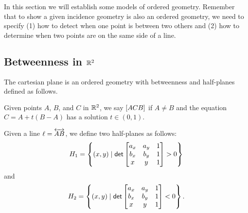 In this section we will establish some models of ordered geometry.
Remember that to show a given incidence geometry is also an ordered geometry, we need to specify (1) how to detect when one point is between two others and (2) how to determine when two points are on the same side of a line.

\subsection{Betweenness in \(\mathbb{R}^2\)}

\begin{prop}
The cartesian plane is an ordered geometry with betweenness and half-planes defined as follows.
\begin{proplist}
\item Given points \(A\), \(B\), and \(C\) in \(\mathbb{R}^2\), we say \([ A C B ]\) if \(A \neq B\) and the equation \(C = A + t(B-A)\) has a solution \(t \in (0,1)\).
\item Given a line \(\ell = \overleftrightarrow{AB}\), we define two half-planes as follows: \[ H_1 = \left\{ (x, y) \mid \mathsf{det} \begin{bmatrix} a_x & a_y & 1 \\ b_x & b_y & 1 \\ x & y & 1 \end{bmatrix} > 0 \right\} \] and \[ H_2 = \left\{ (x, y) \mid \mathsf{det} \begin{bmatrix} a_x & a_y & 1 \\ b_x & b_y & 1 \\ x & y & 1 \end{bmatrix} < 0 \right\}. \]
\end{proplist}
\end{prop}

